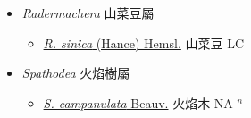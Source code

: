 
  \begin{itemize}
 \item[] \textit{Radermachera} 山菜豆屬
                    
  \begin{itemize}
        \item[] \href{http://www.theplantlist.org/tpl1.1/search?q=Radermachera+sinica}{\textit{R. sinica} (Hance) Hemsl.}   山菜豆 LC
  \end{itemize}
 \item[] \textit{Spathodea} 火焰樹屬
                    
  \begin{itemize}
        \item[] \href{http://www.theplantlist.org/tpl1.1/search?q=Spathodea+campanulata}{\textit{S. campanulata} Beauv.}   火焰木 NA $^n$
  \end{itemize}
  \end{itemize}
